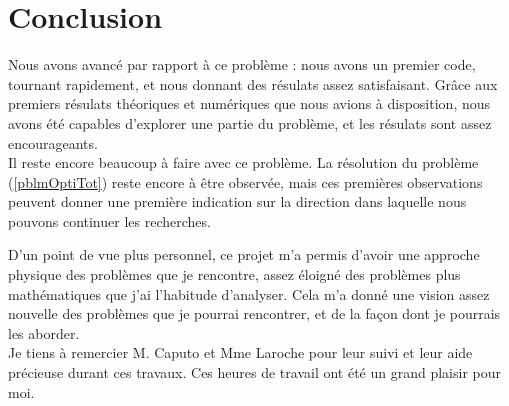 \documentclass{article}
\begin{document}
%
\clearpage

\section*{Conclusion}
Nous avons avancé par rapport à ce problème : nous avons un premier code, tournant rapidement, et nous donnant des résulats assez satisfaisant. Grâce aux premiers résulats théoriques et numériques que nous avions à disposition, nous avons été capables d'explorer une partie du problème, et les résulats sont assez encourageants.\\
Il reste encore beaucoup à faire avec ce problème. La résolution du problème (\ref{pblmOptiTot}) reste encore à être observée, mais ces premières observations peuvent donner une première indication sur la direction dans laquelle nous pouvons continuer les recherches.

\bigskip
D'un point de vue plus personnel, ce projet m'a permis d'avoir une approche physique des problèmes que je rencontre, assez éloigné des problèmes plus mathématiques que j'ai l'habitude d'analyser. Cela m'a donné une vision assez nouvelle des problèmes que je pourrai rencontrer, et de la façon dont je pourrais les aborder.\\
Je tiens à remercier M. Caputo et Mme Laroche pour leur suivi et leur aide précieuse durant ces travaux. Ces heures de travail ont été un grand plaisir pour moi.



\end{document}
